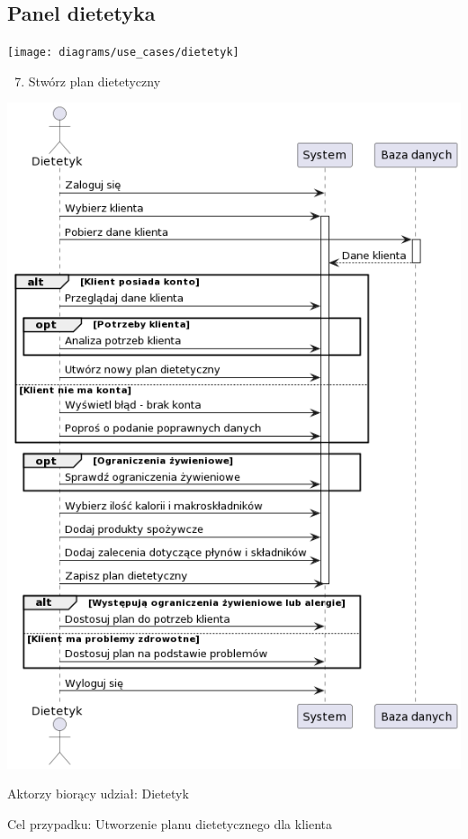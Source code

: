 \subsection{Panel dietetyka}\label{subsec:panel-dietetyka}

{\texttt{[image: diagrams/use\_cases/dietetyk]}}

\begin{enumerate}
\setcounter{enumi}{6}
\tightlist
\item
  {Stwórz plan dietetyczny}
\end{enumerate}

{\includegraphics{diagrams/sequence/dietetyk_stworz_plan}}

{Aktorzy biorący udział: Dietetyk}

{Cel przypadku: Utworzenie planu dietetycznego dla klienta}

